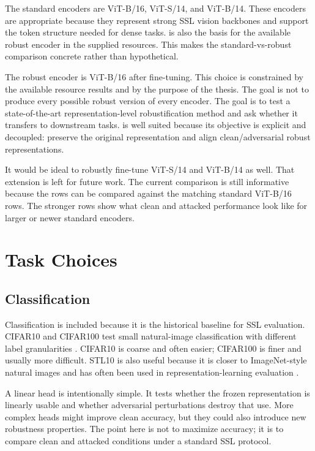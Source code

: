 The standard encoders are \DINO ViT-B/16, \DINOv ViT-S/14, and \DINOv ViT-B/14. These encoders are appropriate because they represent strong SSL vision backbones and support the token structure needed for dense tasks. \DINO is also the basis for the available \DeACL robust encoder in the supplied resources. This makes the standard-vs-robust comparison concrete rather than hypothetical.

The robust encoder is \DINO ViT-B/16 after \DeACL fine-tuning. This choice is constrained by the available resource results and by the purpose of the thesis. The goal is not to produce every possible robust version of every encoder. The goal is to test a state-of-the-art representation-level robustification method and ask whether it transfers to downstream tasks. \DeACL is well suited because its objective is explicit and decoupled: preserve the original representation and align clean/adversarial robust representations.

It would be ideal to robustly fine-tune \DINOv ViT-S/14 and \DINOv ViT-B/14 as well. That extension is left for future work. The current comparison is still informative because the \DeACL rows can be compared against the matching standard \DINO ViT-B/16 rows. The stronger \DINOv rows show what clean and attacked performance look like for larger or newer standard encoders.

\section{Task Choices}

\subsection{Classification}

Classification is included because it is the historical baseline for SSL evaluation. CIFAR10 and CIFAR100 test small natural-image classification with different label granularities \parencite{krizhevsky2009learning}. CIFAR10 is coarse and often easier; CIFAR100 is finer and usually more difficult. STL10 is also useful because it is closer to ImageNet-style natural images and has often been used in representation-learning evaluation \parencite{coates2011analysis}.

A linear head is intentionally simple. It tests whether the frozen representation is linearly usable and whether adversarial perturbations destroy that use. More complex heads might improve clean accuracy, but they could also introduce new robustness properties. The point here is not to maximize accuracy; it is to compare clean and attacked conditions under a standard SSL protocol.

